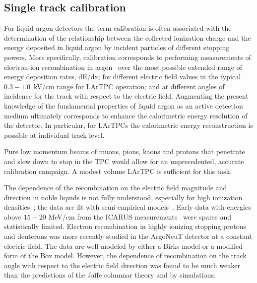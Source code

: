 \documentclass[DIV=calc, paper=a4, fontsize=10pt, twocolumn]{scrartcl}	 %
\begin{document}
{\subsection{ Single track calibration}
 
For liquid argon detectors the term calibration is often associated with the determination of the relationship between the collected ionization charge and the energy deposited in liquid argon by incident particles of different stopping powers. More specifically, calibration corresponds to performing measurements of electron-ion recombination in argon~\cite{miyajima,jaffe,onsager,box} over the most possible extended range of energy deposition rates, dE/dx; for different electric field values in the typical $0.3-1.0$~kV/cm range for LArTPC operation; and at different angles of incidence for the track with respect to the electric field. Augmenting the present knowledge of the fundamental properties of liquid argon as an active detection medium ultimately corresponds to enhance the calorimetric energy resolution of the detector. In particular, for LArTPCs the calorimetric energy reconstruction is possible at individual track level.
  
Pure low momentum beams of muons, pions, kaons and protons that penetrate and slow down to stop in the TPC would allow for an unprecedented, accurate calibration campaign. A modest volume LArTPC is sufficient for this task.
  
The dependence of the recombination on the electric field magnitude and direction in noble liquids is not fully understood, especially for high ionization densities~\cite{sala};  the data are fit with semi-empirical models~\cite{birks}.  Early data with energies above $15-20$ MeV/cm from the ICARUS measurements~\cite{fpp} were sparse and statistically limited.  Electron recombination in highly ionizing stopping protons and deuterons was more recently studied in the ArgoNeuT detector at a constant electric field\cite{argoneut_recomb}. The data are well-modeled by either a Birks model or a modified form of the Box model. However, the dependence of recombination on the track angle with respect to the electric field direction was found to be much weaker than the predictions of the Jaffe columnar theory and by simulations. 
  
}
\end{document}
